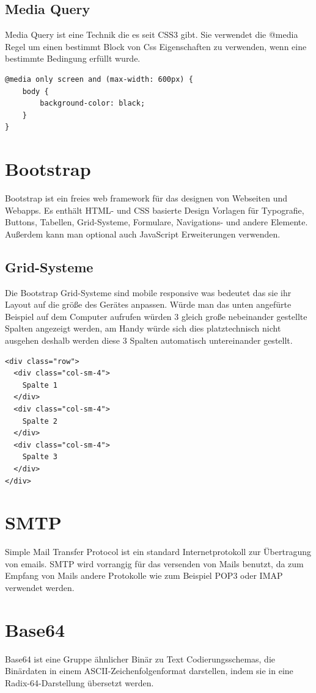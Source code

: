 \subsection{Media Query}
Media Query ist eine Technik die es seit CSS3 gibt.
Sie verwendet die @media Regel um einen bestimmt Block von Css Eigenschaften zu verwenden, wenn eine bestimmte Bedingung erfüllt wurde.

\begin{lstlisting}
@media only screen and (max-width: 600px) {
    body {
        background-color: black;
    }
}
\end{lstlisting}

\section{Bootstrap}
Bootstrap ist ein freies web framework für das designen von Webseiten und Webapps. Es enthält HTML- und CSS basierte Design Vorlagen für Typografie, Buttons, Tabellen, Grid-Systeme, Formulare, Navigations- und andere Elemente. Außerdem kann man optional auch JavaScript Erweiterungen verwenden.

\subsection{Grid-Systeme}
Die Bootstrap Grid-Systeme sind mobile responsive was bedeutet das sie ihr Layout auf die größe des Gerätes anpassen. Würde man das unten angefürte Beispiel auf dem Computer aufrufen würden 3 gleich große nebeinander gestellte Spalten angezeigt werden, am Handy würde sich dies platztechnisch nicht ausgehen deshalb werden diese 3 Spalten automatisch untereinander gestellt.

\begin{lstlisting}
<div class="row">
  <div class="col-sm-4">
  	Spalte 1
  </div>
  <div class="col-sm-4">
  	Spalte 2
  </div>
  <div class="col-sm-4">
  	Spalte 3
  </div>
</div>
\end{lstlisting}

\section{SMTP}
Simple Mail Transfer Protocol ist ein standard Internetprotokoll zur Übertragung von emails. SMTP wird vorrangig für das versenden von Mails benutzt, da zum Empfang von Mails andere Protokolle wie zum Beispiel POP3 oder IMAP verwendet werden.

\section{Base64}
Base64 ist eine Gruppe ähnlicher Binär zu Text Codierungsschemas, die Binärdaten in einem ASCII-Zeichenfolgenformat darstellen, indem sie in eine Radix-64-Darstellung übersetzt werden.